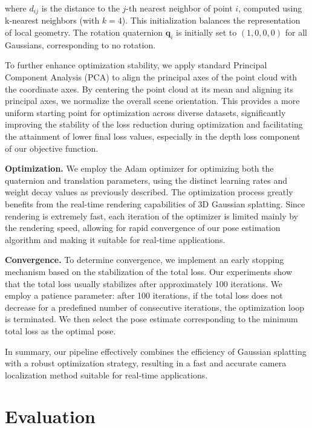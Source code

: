 \documentclass[twocolumn]{article} %
\begin{document}
where \(d_{ij}\) is the distance to the \(j\)-th nearest neighbor of
point \(i\), computed using k-nearest neighbors (with \(k=4\)). This
initialization balances the representation of local geometry. The
rotation quaternion \(\mathbf{q}_i\) is initially set to
\((1, 0, 0, 0)\) for all Gaussians, corresponding to no rotation.

To further enhance optimization stability, we apply standard Principal
Component Analysis (PCA) to align the principal axes of the point cloud
with the coordinate axes. By centering the point cloud at its mean and
aligning its principal axes, we normalize the overall scene orientation.
This provides a more uniform starting point for optimization across
diverse datasets, significantly improving the stability of the loss
reduction during optimization and facilitating the attainment of lower
final loss values, especially in the depth loss component of our
objective function.

\textbf{Optimization.} We employ the
Adam\cite{kingmaAdamMethodStochastic2014} optimizer for optimizing
both the quaternion and translation parameters, using the distinct
learning rates and weight decay values as previously described. The
optimization process greatly benefits from the real-time rendering
capabilities of 3D Gaussian splatting. Since rendering is extremely
fast, each iteration of the optimizer is limited mainly by the rendering
speed, allowing for rapid convergence of our pose estimation algorithm
and making it suitable for real-time applications.

\textbf{Convergence.} To determine convergence, we implement an early
stopping mechanism based on the stabilization of the total loss. Our
experiments show that the total loss usually stabilizes after
approximately 100 iterations. We employ a patience parameter: after 100
iterations, if the total loss does not decrease for a predefined number
of consecutive iterations, the optimization loop is terminated. We then
select the pose estimate corresponding to the minimum total loss as the
optimal pose.

In summary, our pipeline effectively combines the efficiency of Gaussian
splatting with a robust optimization strategy, resulting in a fast and
accurate camera localization method suitable for real-time applications.

\section{Evaluation}\label{evaluation}
\end{document}

